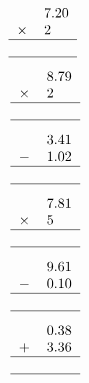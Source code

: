 \documentclass[leqno, 12pt]{article}
\begin{document}
\begin{multicols}{3}
\begin{equation}
{\begin{tabular}{c S[table-format=1.2]}
         &7.20 \tabularnewline
        $\times$&2 \tabularnewline
        \hline
         & \tabularnewline
        \hline
    \end{tabular}}
\end{equation}
\vspace{-1pt}%
\begin{equation}
    \raisebox{-0.8cm}{
        \begin{tabular}{c S[table-format=1.2]}
         &8.79 \tabularnewline
        $\times$&2 \tabularnewline
        \hline
         & \tabularnewline
        \hline
    \end{tabular}}
\end{equation}
\vspace{-1pt}%
\begin{equation}
    \raisebox{-0.8cm}{
        \begin{tabular}{c S[table-format=1.2]}
         &3.41 \tabularnewline
        $-$&1.02 \tabularnewline
        \hline
         & \tabularnewline
        \hline
    \end{tabular}}
\end{equation}
\vspace{-1pt}%
\begin{equation}
    \raisebox{-0.8cm}{
        \begin{tabular}{c S[table-format=1.2]}
         &7.81 \tabularnewline
        $\times$&5 \tabularnewline
        \hline
         & \tabularnewline
        \hline
    \end{tabular}}
\end{equation}
\vspace{-1pt}%
\begin{equation}
    \raisebox{-0.8cm}{
        \begin{tabular}{c S[table-format=1.2]}
         &9.61 \tabularnewline
        $-$&0.10 \tabularnewline
        \hline
         & \tabularnewline
        \hline
    \end{tabular}}
\end{equation}
\vspace{-1pt}%
\begin{equation}
    \raisebox{-0.8cm}{
        \begin{tabular}{c S[table-format=1.2]}
         &0.38 \tabularnewline
        $+$&3.36 \tabularnewline
        \hline
         & \tabularnewline
        \hline
    \end{tabular}}
\end{equation}

\end{multicols}
\end{document}
